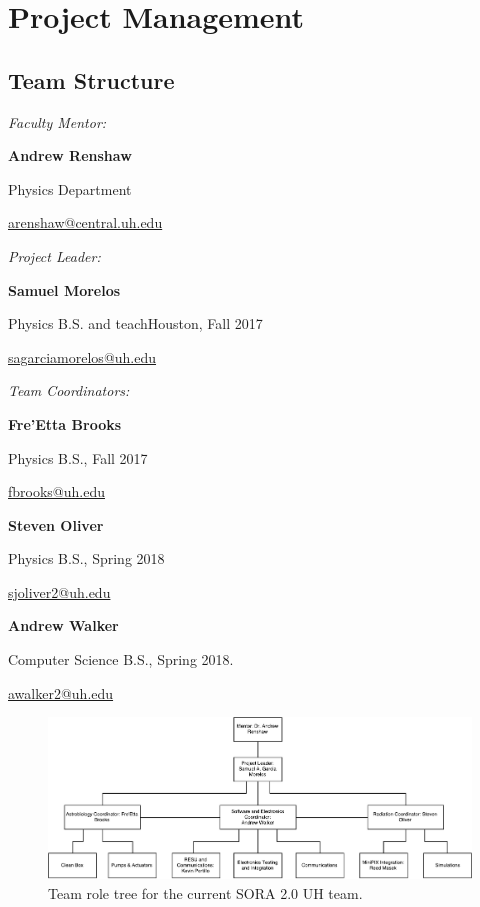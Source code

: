 \section{Project Management}
\label{sec:Management}

\subsection{Team Structure}
\label{sec:Team}
\emph{Faculty Mentor:}\par
    \textbf{Andrew Renshaw}\par
    Physics Department\par
    \url{arenshaw@central.uh.edu}\par
\emph{Project Leader:}\par
    \textbf{Samuel Morelos}\par
    Physics B.S. and teachHouston, Fall 2017\par
    \url{sagarciamorelos@uh.edu}\par
\emph{Team Coordinators:}\par
	\textbf{Fre’Etta Brooks}\par
    Physics B.S., Fall 2017\par
    \url{fbrooks@uh.edu}\par
    \textbf{Steven Oliver}\par
    Physics B.S., Spring 2018\par
    \url{sjoliver2@uh.edu}\par
    \textbf{Andrew Walker}\par
    Computer Science B.S., Spring 2018.\par
	\url{awalker2@uh.edu}\par

\begin{figure}[!h]
\begin{center}
\includegraphics[width=1\textwidth]{./Figures/RoleTree.pdf}
\caption{Team role tree for the current SORA 2.0 UH team.}
\label{fig:role} 
\end{center}
\end{figure}

